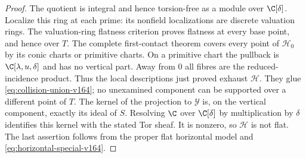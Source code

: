 \begin{proof}
The quotient is integral and hence torsion-free as a module over
$\C[\delta]$. Localize this ring at each prime: its nonfield
localizations are discrete valuation rings. The valuation-ring
flatness criterion \cite[Tag~0539]{Stacks164} proves flatness at
every base point, and hence over $T$.
The complete first-contact theorem covers every point of
$\mathcal H_0$ by its conic charts or primitive charts. On a primitive
chart the pullback is $\C[\lambda,u,\delta]$ and has no vertical
part. Away from $0$ all fibres are the reduced-incidence product.
Thus the local descriptions just proved exhaust $\mathcal H$.
They glue \eqref{eq:collision-union-v164}; no unexamined component
can be supported over a different point of $T$. The kernel of the
projection to $\mathcal Y$ is, on the vertical component, exactly
its ideal of $S$. Resolving $\C$ over $\C[\delta]$ by multiplication
by $\delta$ identifies this kernel with the stated Tor sheaf.
It is nonzero, so $\mathcal H$ is not flat. The last assertion follows
from the proper flat horizontal model and
\eqref{eq:horizontal-special-v164}.
\end{proof}

